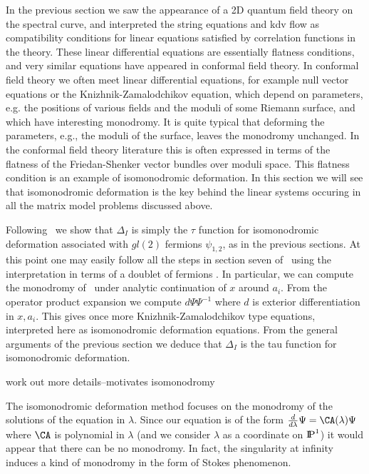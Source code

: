 In the previous section we saw the appearance of a 2D quantum field 
theory on the spectral curve, and interpreted the 
string equations and kdv flow as 
compatibility conditions for linear equations satisfied by 
correlation functions in the theory.
These linear differential equations are essentially 
flatness conditions, and very similar equations have
appeared in conformal field theory.
In conformal field theory we often meet linear differential equations, 
for example null vector equations or 
the Knizhnik-Zamalodchikov equation, which depend 
on parameters, e.g. the positions of various fields and the 
moduli of some Riemann surface, and which have interesting 
monodromy. It is quite typical that deforming the parameters, 
e.g., the moduli of the surface, leaves the monodromy 
unchanged. In the conformal field theory literature this is 
often expressed in terms of the flatness of the Friedan-Shenker
vector bundles over moduli space. This flatness condition 
is an example of isomonodromic deformation. In this section
we will see that isomonodromic deformation is the key behind
the linear systems occuring in all the matrix model 
problems discussed above.


Following \dnsmt\ we show that $\Delta_I$ is simply the 
$\tau$ function for isomonodromic deformation associated with 
$gl(2)$ fermions $\psi_{1,2}$, as in the previous sections.
At this point one may easily follow all the steps in 
section seven of \dnsmt\ using the interpretation in terms of a doublet
of fermions
. 
In particular, we can compute the monodromy of 
\levii\ under analytic continuation of $x$ around $a_i$. From the 
operator product expansion we compute $d\Psi \Psi^{-1}$
where $d$ is exterior differentiation in $x,a_i$. This gives once more
Knizhnik-Zamalodchikov type equations, interpreted here as 
isomonodromic deformation equations. From the general arguments of the 
previous section we deduce that $\Delta_I$ is the tau function 
for isomonodromic deformation.

work out more details--motivates isomonodromy


The isomonodromic deformation method focuses on the monodromy
of the solutions of the equation in $\lambda$. Since our 
equation is of the form
${d\over d\lambda}\Psi=\CA(\lambda)\Psi$ where $\CA$ is polynomial
in $\lambda$ (and 
we consider $\lambda$ as a coordinate on $\relax{\rm I\kern-.18em P}^1$) 
it would appear that there can be no monodromy. In fact, the 
singularity at infinity induces a kind of monodromy in the 
form of Stokes phenomenon.

